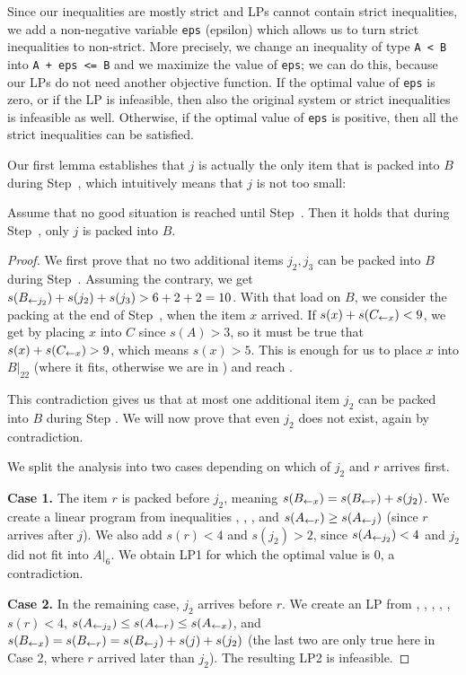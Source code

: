 Since our inequalities are mostly strict and LPs cannot
contain strict inequalities, we add a non-negative variable \texttt{eps} (epsilon)
which allows us to turn strict inequalities to non-strict.
More precisely, we change an inequality of type \texttt{A < B} into \texttt{A + eps <= B}
and we maximize the value of \texttt{eps}; we can do this, because our LPs
do not need another objective function. If the optimal value of \texttt{eps} 
is zero, or if the LP is infeasible, then also the original system or strict inequalities
is infeasible as well. Otherwise, if the optimal value of \texttt{eps} is positive,
then all the strict inequalities can be satisfied.

Our first lemma establishes that $j$ is actually the only item that
is packed into $B$ during Step~, which intuitively means that
$j$ is not too small:

\begin{lem}\label{lem:onej}
Assume that no good situation is reached until Step~{\rm {}}. Then
it holds that during Step~{\rm {}}, only $j$ is packed into $B$.
\end{lem}

\begin{proof}
We first prove that no two additional items $j_2, j_3$ can be packed into $B$
during Step~. Assuming the contrary, we get $s(B_{\leftarrow j_2}) +
s(j_2) + s(j_3) > 6 + 2 + 2 = 10$. With that load on $B$, we consider
the packing at the end of Step~, when the item $x$ arrived. If
$s(x) + s(C_{\leftarrow x}) < 9$, we get  by placing $x$ into $C$ since $s(A)>3$, so it must be true
that $s(x) + s(C_{\leftarrow x}) > 9$, which means $s(x) >
5$. This is enough for us to place $x$ into $B|_{22}$
(where it fits, otherwise we are in ) and reach .

This contradiction gives us that at most one additional item $j_2$ can
be packed into $B$ during Step . We will now prove that
even $j_2$ does not exist, again by contradiction.

We split the analysis into two cases depending on which of $j_2$ and $r$ arrives first.

\smallskip
\noindent \textbf{Case 1.} The item $r$ is packed
before $j_2$, meaning $s(B_{\leftarrow x}) = s(B_{\leftarrow r}) + s(j_2)$.
We create a linear program from inequalities , , ,  
and $s(A_{\leftarrow r}) \ge s(A_{\leftarrow j})$ (since $r$ arrives after $j$).
We also add $s(r)<4$ and $s(j_2) > 2$, since
$s(A_{\leftarrow j_2}) < 4$ and $j_2$ did not fit into $A|_{6}$.
We obtain LP1 for which the optimal value is 0, a contradiction.

\smallskip

\noindent \textbf{Case 2.} In the remaining case, $j_2$ arrives before $r$.
We create an LP from , , , , , $s(r) < 4$,
$s(A_{\leftarrow j_2}) \le s(A_{\leftarrow r}) \le s(A_{\leftarrow x})$,
and $s(B_{\leftarrow x}) = s(B_{\leftarrow r}) = s(B_{\leftarrow j}) + s(j) + s(j_2)$
(the last two are only true here in Case 2, where $r$ arrived later than $j_2$).
The resulting LP2 is infeasible.
\end{proof}

